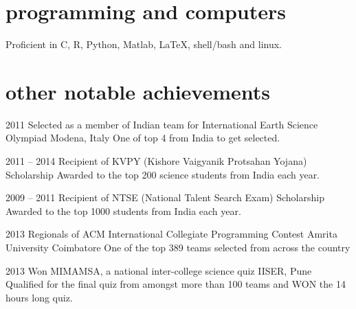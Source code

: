 \documentclass[11pt]{friggeri-cv}
\begin{document}
\section{programming and computers}
Proficient in C, R, Python,
    Matlab,
    \LaTeX,
    shell/bash and
    linux.



\section{other notable achievements}

\begin{entrylist}
  \entryy
    {2011}
    {Selected as a member of Indian team for International Earth Science Olympiad}
    {Modena, Italy}
    {One of top 4 from India to get selected.}
\end{entrylist}


\begin{entrylist}
  \entryy
    {2011 -- 2014}
    {Recipient of KVPY (Kishore Vaigyanik Protsahan Yojana) Scholarship}{}
    {Awarded to the top 200 science students from India each year.}

\end{entrylist}


\begin{entrylist}
  \entryy
    {2009 -- 2011}
    {Recipient of NTSE (National Talent Search Exam) Scholarship}{}
    {Awarded to the top 1000 students from India each year.}
\end{entrylist}


\begin{entrylist}
  \entryy
    {2013}
    {Regionals of ACM International Collegiate Programming Contest}
    {Amrita University Coimbatore}
    {One of the top 389 teams selected from across the country}
\end{entrylist}


\begin{entrylist}
  \entryy
    {2013}
    {Won MIMAMSA, a national inter-college science quiz}
    {IISER, Pune}
    {Qualified for the final quiz from amongst more than 100 teams and WON the 14 hours long quiz.}
\end{entrylist}
\end{document}
